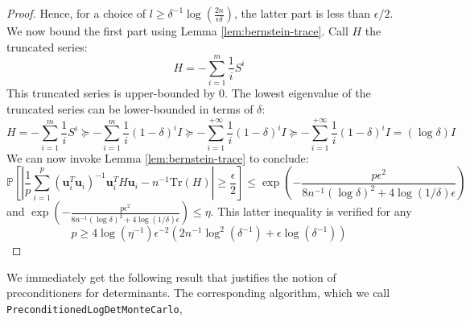 \begin{proof}
Hence, for a choice of $l\geq\delta^{-1}\log\left(\frac{2n}{\epsilon\delta}\right)$,
the latter part is less than $\epsilon/2$. We now bound the first
part using Lemma \ref{lem:bernstein-trace}. Call $H$ the truncated
series: 
\[
H=-\sum_{i=1}^{m}\frac{1}{i}S^{i}
\]
This truncated series is upper-bounded by $0$. The lowest eigenvalue
of the truncated series can be lower-bounded in terms of $\delta$:
\[
H=-\sum_{i=1}^{m}\frac{1}{i}S^{i}\succeq-\sum_{i=1}^{m}\frac{1}{i}\left(1-\delta\right)^{i}I\succeq-\sum_{i=1}^{+\infty}\frac{1}{i}\left(1-\delta\right)^{i}I\succeq-\sum_{i=1}^{+\infty}\frac{1}{i}\left(1-\delta\right)^{i}I=\left(\log\delta\right)I
\]
We can now invoke Lemma \ref{lem:bernstein-trace} to conclude: 
\[
\mathbb{P}\left[\left|\frac{1}{p}\sum_{i=1}^{p}\left(\mathbf{u}_{i}^{T}\mathbf{u}_{i}\right)^{-1}\mathbf{u}_{i}^{T}H\mathbf{u}_{i}-n^{-1}\mbox{Tr}\left(H\right)\right|\geq\frac{\epsilon}{2}\right]\leq\exp\left(-\frac{p\epsilon^{2}}{8n^{-1}\left(\log\delta\right)^{2}+4\log\left(1/\delta\right)\epsilon}\right)
\]
and $\exp\left(-\frac{p\epsilon^{2}}{8n^{-1}\left(\log\delta\right)^{2}+4\log\left(1/\delta\right)\epsilon}\right)\leq\eta$.
This latter inequality is verified for any 
\[
p\geq4\log\left(\eta^{-1}\right)\epsilon^{-2}\left(2n^{-1}\log^{2}\left(\delta^{-1}\right)+\epsilon\log\left(\delta^{-1}\right)\right)
\]


\end{proof} We immediately get the following result that justifies
the notion of preconditioners for determinants. The corresponding
algorithm, which we call \texttt{PreconditionedLogDetMonteCarlo},
